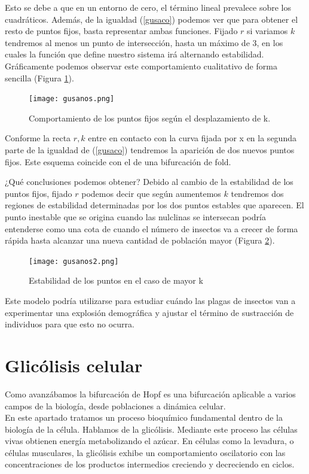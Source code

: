 Esto se debe a que en un entorno de cero, el término lineal prevalece sobre los cuadráticos. Además, de la igualdad (\ref{gusaco}) podemos ver que para obtener el resto de puntos fijos, basta representar ambas funciones.
Fijado $r$ si variamos $k$ tendremos al menos un punto de intersección, hasta un máximo de 3, en los cuales la función que define nuestro sistema irá alternando estabilidad. Gráficamente podemos observar este comportamiento cualitativo de forma sencilla (Figura \ref{gusanos}).
 \begin{figure}[H]
 	\centering
 	\texttt{[image: gusanos.png]}
 	\caption{Comportamiento de los puntos fijos según el desplazamiento de k.}
 \label{gusanos}
\end{figure}
Conforme la recta $r,k$ entre en contacto con la curva fijada por x en la segunda parte de la igualdad de (\ref{gusaco}) tendremos la aparición de dos nuevos puntos fijos. Este esquema coincide con el de una bifurcación de fold. 

¿Qué conclusiones podemos obtener?
Debido al cambio de la estabilidad de los puntos fijos, fijado $r$ podemos decir que según aumentemos $k$ tendremos dos regiones de estabilidad determinadas por los dos puntos estables que aparecen. El punto inestable que se origina cuando las nulclinas se intersecan podría entenderse como una cota de cuando el número de insectos va a crecer de forma rápida hasta alcanzar una nueva cantidad de población mayor (Figura \ref{gusanos2}).
 \begin{figure}[h]
 	\centering
 	\texttt{[image: gusanos2.png]}
 	\caption{Estabilidad de los puntos en el caso de mayor k }
 \label{gusanos2}
\end{figure}
Este modelo podría utilizarse para estudiar cuándo las plagas de insectos van a experimentar una explosión demográfica y ajustar el término de sustracción de individuos para que esto no ocurra. 
\section{Glicólisis celular}
Como avanzábamos la bifurcación de Hopf es una bifurcación aplicable a varios campos de la biología, desde poblaciones a dinámica celular.\\En este apartado tratamos un proceso bioquímico fundamental dentro de la biología de la célula. Hablamos de la glicólisis. Mediante este proceso las células vivas obtienen energía metabolizando el azúcar. En células como la levadura, o células musculares, la glicólisis exhibe un comportamiento oscilatorio con las concentraciones de los productos intermedios creciendo y decreciendo en ciclos.

